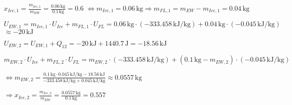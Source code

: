 \( x_{Ice,1} = \frac{m_{Ice,1}}{m_{EW}} = \frac{0.06 \, \text{kg}}{0.1 \, \text{kg}} = 0.6 \)  
\(\Longleftrightarrow m_{Ice,1} = 0.06 \, \text{kg} \Longrightarrow m_{FL,1} = m_{EW} - m_{Ice,1} = 0.04 \, \text{kg} \)  

\( U_{EW,1} = m_{Ice,1} \cdot U_{Ice} + m_{FL,1} \cdot U_{FL} = 0.06 \, \text{kg} \cdot (-333.458 \, \text{kJ/kg}) + 0.04 \, \text{kg} \cdot (-0.045 \, \text{kJ/kg}) \)  
\( \approx -20 \, \text{kJ} \)  

\( U_{EW,2} = U_{EW,1} + Q_{12} = -20 \, \text{kJ} + 1440.7 \, \text{J} = -18.56 \, \text{kJ} \)  

\( m_{EW,2} \cdot U_{Ice} + m_{FL,2} \cdot U_{FL} = m_{EW,2} \cdot (-333.458 \, \text{kJ/kg}) + (0.1 \, \text{kg} - m_{EW,2}) \cdot (-0.045 \, \text{kJ/kg}) \)  

\(\Longleftrightarrow m_{EW,2} = \frac{0.1 \, \text{kg} \cdot 0.045 \, \text{kJ/kg} - 18.56 \, \text{kJ}}{-333.458 \, \text{kJ/kg} + 0.045 \, \text{kJ/kg}} \approx 0.0557 \, \text{kg} \)  

\(\Longrightarrow x_{Ice,2} = \frac{m_{Ice,2}}{m_{EW}} = \frac{0.0557 \, \text{kg}}{0.1 \, \text{kg}} = 0.557 \)